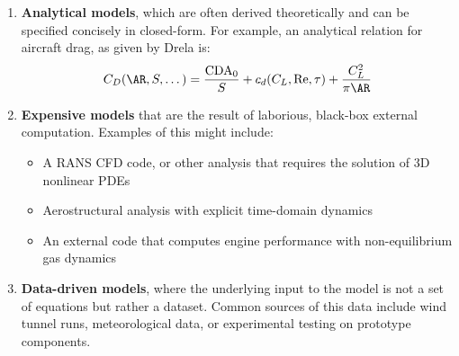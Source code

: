 \begin{enumerate}[noitemsep]
    \item \textbf{Analytical models}, which are often derived theoretically and can be specified concisely in closed-form. For example, an analytical relation for aircraft drag, as given by Drela \cite{drela-performance-lab} is:
    \begin{equation}
        C_D(\AR, S, \dots) = \frac{\text{CDA}_0}{S} + c_d(C_L, \text{Re}, \tau) + \frac{C_L^2}{\pi \AR}
        \label{eq:analytical-drag}
    \end{equation}
    \begin{multicols}{2}
    \end{multicols}

    \item \textbf{Expensive models} that are the result of laborious, black-box external computation. Examples of this might include:

    \begin{itemize}[noitemsep]

        \item A RANS CFD code, or other analysis that requires the solution of 3D nonlinear PDEs
        \item Aerostructural analysis with explicit time-domain dynamics
        \item An external code that computes engine performance with non-equilibrium gas dynamics

    \end{itemize}

    \item \textbf{Data-driven models}, where the underlying input to the model is not a set of equations but rather a dataset. Common sources of this data include wind tunnel runs, meteorological data, or experimental testing on prototype components.

\end{enumerate}

